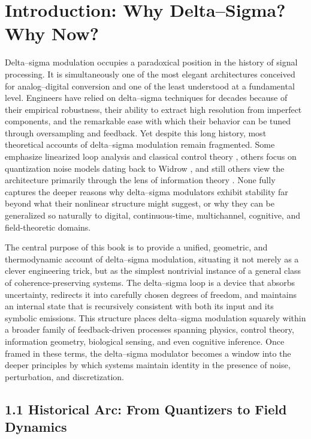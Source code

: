 \chapter{Introduction: Why Delta--Sigma? Why Now?}

Delta--sigma modulation occupies a paradoxical position in the history of signal processing. It is simultaneously one of the most elegant architectures conceived for analog--digital conversion and one of the least understood at a fundamental level. Engineers have relied on delta--sigma techniques for decades because of their empirical robustness, their ability to extract high resolution from imperfect components, and the remarkable ease with which their behavior can be tuned through oversampling and feedback. Yet despite this long history, most theoretical accounts of delta--sigma modulation remain fragmented. Some emphasize linearized loop analysis and classical control theory \citep{schreier2005understanding}, others focus on quantization noise models dating back to Widrow \citep{widrow1956statistical,widrow1959statistical}, and still others view the architecture primarily through the lens of information theory \citep{jayant1993digital}. None fully captures the deeper reasons why delta--sigma modulators exhibit stability far beyond what their nonlinear structure might suggest, or why they can be generalized so naturally to digital, continuous-time, multichannel, cognitive, and field-theoretic domains.

The central purpose of this book is to provide a unified, geometric, and thermodynamic account of delta--sigma modulation, situating it not merely as a clever engineering trick, but as the simplest nontrivial instance of a general class of coherence-preserving systems. The delta--sigma loop is a device that absorbs uncertainty, redirects it into carefully chosen degrees of freedom, and maintains an internal state that is recursively consistent with both its input and its symbolic emissions. This structure places delta--sigma modulation squarely within a broader family of feedback-driven processes spanning physics, control theory, information geometry, biological sensing, and even cognitive inference. Once framed in these terms, the delta--sigma modulator becomes a window into the deeper principles by which systems maintain identity in the presence of noise, perturbation, and discretization.

\section*{1.1 Historical Arc: From Quantizers to Field Dynamics}

